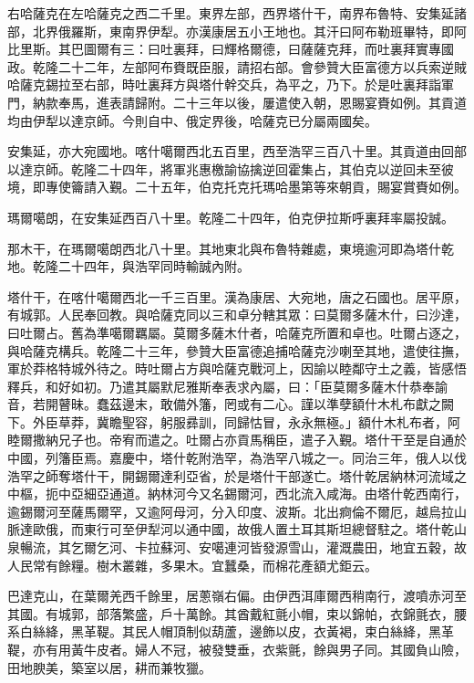 \begin{pinyinscope}
右哈薩克在左哈薩克之西二千里。東界左部，西界塔什干，南界布魯特、安集延諸部，北界俄羅斯，東南界伊犁。亦漢康居五小王地也。其汗曰阿布勒班畢特，即阿比里斯。其巴圖爾有三：曰吐裏拜，曰輝格爾德，曰薩薩克拜，而吐裏拜實專國政。乾隆二十二年，左部阿布賚既臣服，請招右部。會參贊大臣富德方以兵索逆賊哈薩克錫拉至右部，時吐裏拜方與塔什幹交兵，為平之，乃下。於是吐裏拜詣軍門，納款奉馬，進表請歸附。二十三年以後，屢遣使入朝，恩賜宴賚如例。其貢道均由伊犁以達京師。今則自中、俄定界後，哈薩克已分屬兩國矣。

安集延，亦大宛國地。喀什噶爾西北五百里，西至浩罕三百八十里。其貢道由回部以達京師。乾隆二十四年，將軍兆惠檄諭協擒逆回霍集占，其伯克以逆回未至彼境，即專使籥請入覲。二十五年，伯克托克托瑪哈墨第等來朝貢，賜宴賞賚如例。

瑪爾噶朗，在安集延西百八十里。乾隆二十四年，伯克伊拉斯呼裏拜率屬投誠。

那木干，在瑪爾噶朗西北八十里。其地東北與布魯特雜處，東境逾河即為塔什乾地。乾隆二十四年，與浩罕同時輸誠內附。

塔什干，在喀什噶爾西北一千三百里。漢為康居、大宛地，唐之石國也。居平原，有城郭。人民奉回教。與哈薩克同以三和卓分轄其眾：曰莫爾多薩木什，曰沙達，曰吐爾占。舊為準噶爾羈屬。莫爾多薩木什者，哈薩克所置和卓也。吐爾占逐之，與哈薩克構兵。乾隆二十三年，參贊大臣富德追捕哈薩克沙喇至其地，遣使往撫，軍於莽格特城外待之。時吐爾占方與哈薩克戰河上，因諭以睦鄰守土之義，皆感悟釋兵，和好如初。乃遣其屬默尼雅斯奉表求內屬，曰：「臣莫爾多薩木什恭奉諭音，若開瞽昧。蠢茲邊末，敢備外籓，罔或有二心。謹以準孽額什木札布獻之闕下。外臣草莽，冀瞻聖容，躬服彞訓，同歸怙冒，永永無極。」額什木札布者，阿睦爾撒納兄子也。帝宥而遣之。吐爾占亦貢馬稱臣，遣子入覲。塔什干至是自通於中國，列籓臣焉。嘉慶中，塔什乾附浩罕，為浩罕八城之一。同治三年，俄人以伐浩罕之師奪塔什干，開錫爾達利亞省，於是塔什干部遂亡。塔什乾居納林河流域之中樞，扼中亞細亞通道。納林河今又名錫爾河，西北流入咸海。由塔什乾西南行，逾錫爾河至薩馬爾罕，又逾阿母河，分入印度、波斯。北出痾倫不爾厄，越烏拉山脈達歐俄，而東行可至伊犁河以通中國，故俄人置土耳其斯坦總督駐之。塔什乾山泉暢流，其乞爾乞河、卡拉蘇河、安噶連河皆發源雪山，灌溉農田，地宜五穀，故人民常有餘糧。樹木叢雜，多果木。宜蠶桑，而棉花產額尤鉅云。

巴達克山，在葉爾羌西千餘里，居蔥嶺右偏。由伊西洱庫爾西稍南行，渡噴赤河至其國。有城郭，部落繁盛，戶十萬餘。其酋戴紅氈小帽，束以錦帕，衣錦氈衣，腰系白絲絳，黑革鞮。其民人帽頂制似葫蘆，邊飾以皮，衣黃褐，束白絲絳，黑革鞮，亦有用黃牛皮者。婦人不冠，被發雙垂，衣紫氈，餘與男子同。其國負山險，田地腴美，築室以居，耕而兼牧獵。


\end{pinyinscope}

